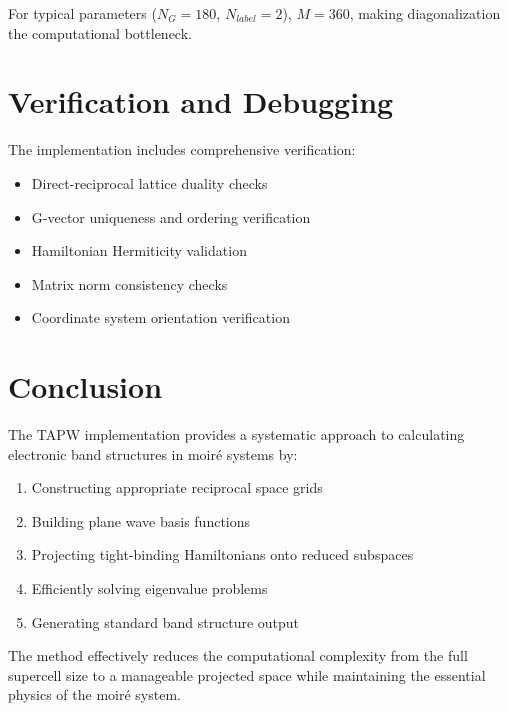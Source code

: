 \documentclass[11pt,a4paper]{article}
\begin{document}
For typical parameters ($N_G = 180$, $N_{label} = 2$), $M = 360$, making diagonalization the computational bottleneck.

\section{Verification and Debugging}

The implementation includes comprehensive verification:
\begin{itemize}
    \item Direct-reciprocal lattice duality checks
    \item G-vector uniqueness and ordering verification  
    \item Hamiltonian Hermiticity validation
    \item Matrix norm consistency checks
    \item Coordinate system orientation verification
\end{itemize}

\section{Conclusion}

The TAPW implementation provides a systematic approach to calculating electronic band structures in moiré systems by:
\begin{enumerate}
    \item Constructing appropriate reciprocal space grids
    \item Building plane wave basis functions
    \item Projecting tight-binding Hamiltonians onto reduced subspaces
    \item Efficiently solving eigenvalue problems
    \item Generating standard band structure output
\end{enumerate}

The method effectively reduces the computational complexity from the full supercell size to a manageable projected space while maintaining the essential physics of the moiré system.
\end{document}
